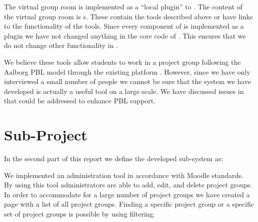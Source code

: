 The virtual group room is implemented as a ``local plugin'' to \moodle{}.
The content of the virtual group room is \block{}s.
These contain the tools described above or have links to the functionality of the tools.
Since every component of \system{} is implemented as a \moodle{} plugin we have not changed anything in the core code of \moodle{}.
This ensures that we do not change other functionality in \moodle{}.

We believe these tools allow students to work in a project group following the Aalborg PBL model through the existing platform \moodle{}.
However, since we have only interviewed a small number of people we cannot be sure that the system we have developed is actually a useful tool on a large scale.
We have discussed issues in  that could be addressed to enhance PBL support.




\section{Sub-Project}
\label{sec:subconclusion}


In the second part of this report we define the developed sub-system as:





We implemented an administration tool in accordance with Moodle standards.
By using this tool administrators are able to add, edit, and delete project groups.
In order to accommodate for a large number of project groups we have created a page with a list of all project groups.
Finding a specific project group or a specific set of project groups is possible by using filtering.

